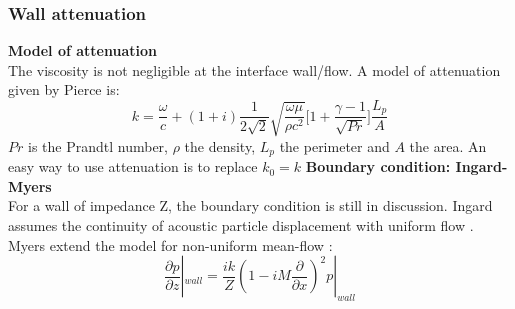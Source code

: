 \subsubsection{Wall attenuation}
\textbf{Model of attenuation}\\
The viscosity is not negligible at the interface wall/flow. A model of attenuation given by Pierce \cite{Pierce} is:
\begin{equation} 
    k=\frac{\omega}{c}+(1+i)\frac{1}{2\sqrt{2}}\sqrt{\frac{\omega\mu}{\rho c^2}}\Bigg[1+\frac{\gamma -1}{\sqrt{Pr}}\Bigg]\frac{L_p}{A}
\end{equation}
$Pr$ is the Prandtl number, $\rho$ the density, $L_p$ the perimeter and $A$ the area. An easy way to use attenuation is to replace $k_0=k$\smallbreak
\noindent\textbf{Boundary condition: Ingard-Myers}\\
For a wall of impedance Z, the boundary condition is still in discussion. Ingard assumes the continuity of acoustic particle displacement with uniform flow \cite{Ingard}. Myers extend the model for non-uniform mean-flow \cite{Myers}:
\begin{equation} 
    \label{eq:Myers}
    \frac{\partial p}{\partial z}|_{wall}=\frac{ik}{Z}(1-iM\frac{\partial}{\partial x})^2 p|_{wall}
\end{equation}
